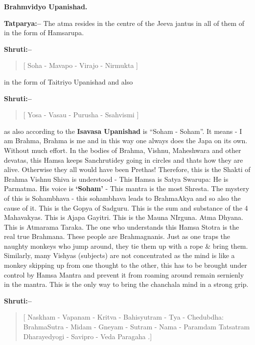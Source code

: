 \begin{flushright}
\textbf{Brahmvidyo Upanishad.}
\end{flushright}

\textbf{Tatparya:–} The atma resides in the centre of the Jeeva jantus in all of them of in the form of Hamsarupa.

\textbf{Shruti:–}

\begin{verse}
[ Soha - Mavapo - Virajo - Nirmukta ]
\end{verse}

in the form of Taitriyo Upanishad and also

\newpage

\textbf{Shruti:–}

\begin{verse}
[ Yosa - Vasau - Purusha - Ssahvismi ]
\end{verse}

as also according to the \textbf{Isavasa Upanishad} is “Soham - Soham”. It means - I am Brahma, Brahma is me and in this way one always does the Japa on its own. Without much effort. In the bodies of Brahma, Vishnu, Maheshwara and other devatas, this Hamsa keeps Sanchrutidey going in circles and thats how they are alive. Otherwise they all would have been Prethas! Therefore, this is the Shakti of Brahma Vishnu Shiva is understood - This Hamsa is Satya Swarupa: He is Parmatma. His voice is \textbf{‘Soham’} - This mantra is the most Shresta. The mystery of this is Sohambhava - this sohambhava leads to BrahmaAkya and so also the cause of it. This is the Gopya of Sadguru. This is the sum and substance of the 4 Mahavakyas. This is Ajapa Gayitri. This is the Mauna NIrguna. Atma Dhyana. This is Atmarama Taraka. The one who understands this Hamsa Stotra is the real true Brahmana. These people are Brahmagnanis. Just as one traps the naughty monkeys who jump around, they tie them up with a rope \& bring them. Similarly, many Vishyas (subjects) are not concentrated as the mind is like a monkey skipping up from one thought to the other, this has to be brought under control by Hamsa Mantra and prevent it from roaming around remain sernienly in the mantra. This is the only way to bring the chanchala mind in a strong grip.

\textbf{Shruti:–}

\begin{verse}
[ Naskham - Vapanam - Kritva - Bahisyutram - Tya - Chedubdha:  BrahmaSutra - Midam - Gneyam - Sutram - Nama - Paramdam  Tatsatram Dharayedyogi - Savipro - Veda Paragaha .]
\end{verse}

